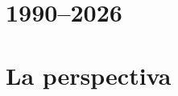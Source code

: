 \documentclass[10pt]{book}
\newcounter{design}[chapter]
\begin{document}
\part{1990--2026}








\part{La perspectiva}















\backmatter




\printindex
\end{document}
